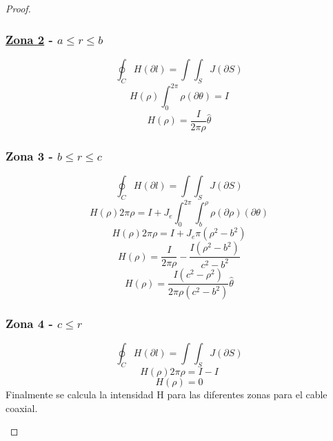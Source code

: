 \begin{proof}
\begin{enumerate}
        \subsubsection*{ \underline{Zona 2} - $a \leq r \leq  b $}
        \begin{equation}
            \oint_C H (\partial l) = \int\int_{S} J (\partial S)
        \end{equation}
        \begin{equation}
             H(\rho)\int_{0}^{2\pi} \rho (\partial \theta) = I
        \end{equation}
        \begin{equation}
            H(\rho) = \frac{I}{2\pi \rho} \hat{\theta}
        \end{equation}
        
        \subsubsection*{ Zona 3 - $b\leq r \leq  c $}
        \begin{equation}
            \oint_C H (\partial l) =  \int\int_{S} J (\partial S)
        \end{equation}
        \begin{equation}
            H(\rho) 2\pi \rho = I + J_{e} \int_{0}^{2\pi} \int_{b}^{\rho} \rho (\partial \rho )(\partial \theta )
        \end{equation}
        \begin{equation}
             H(\rho) 2\pi \rho = I + J_{e} \pi (\rho^{2} - b^{2})
        \end{equation}
        \begin{equation}
              H(\rho) = \frac{I}{2\pi \rho} - \frac{I (\rho^{2} - b^{2})}{c^{2} - b^{2}}
        \end{equation}
        \begin{equation}
              H(\rho) = \frac{I(c^{2} - \rho^{2})}{2\pi \rho (c^{2} - b^{2})} \hat{\theta}
        \end{equation}
        
        \subsubsection*{ Zona 4 - $c\leq  r $}
        \begin{equation}
            \oint_C H (\partial l) =  \int\int_{S} J (\partial S)
        \end{equation}
        \begin{equation}
             H(\rho) 2\pi \rho = I-I
        \end{equation}
        \begin{equation}
            H(\rho) = 0
        \end{equation}
        Finalmente se calcula la intensidad H para las diferentes zonas para el cable coaxial.
        

\end{enumerate}
\end{proof}
